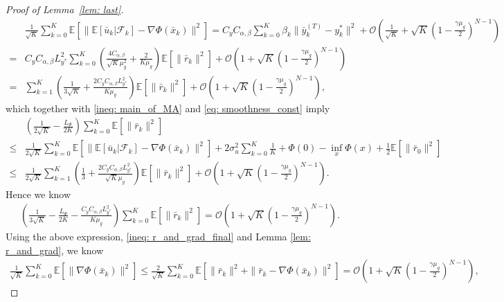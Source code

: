\documentclass{article}
\theoremstyle{plain}
\theoremstyle{definition}
\theoremstyle{remark}
\newcommand{\E}{\mathbb{E}}
\newcommand{\F}{\mathcal{F}}
\newcommand{\cO}{\mathcal{O}}
\begin{document}
\begin{proof}[Proof of Lemma~\ref{lem: last}]
\begin{equation}
\begin{aligned}
            &\frac{1}{\sqrt{K}}\sum_{k=0}^{K}\E\left[\|\E\left[\bar{u}_k|\F_k\right] - \nabla\Phi(\bar{x}_k)\|^2\right]=C_yC_{\alpha,\beta}\sum_{k=0}^{K}\beta_k\|\bar{y}_k^{(T)} - y_k^*\|^2 + \cO\left(\frac{1}{\sqrt{K}} + \sqrt{K}\left(1-\frac{\gamma\mu_g}{2}\right)^{N-1}\right)\\
            = &C_yC_{\alpha,\beta}L_{y^*}^2\sum_{k=0}^{K}\left(\frac{4C_{\alpha,\beta}}{\sqrt{K}\mu_g^2}+\frac{2}{K\mu_g}\right)\E\left[\|\bar{r}_k\|^2\right] + \cO\left(1 + \sqrt{K}\left(1-\frac{\gamma\mu_g}{2}\right)^{N-1}\right)\\ 
            =&\sum_{k=1}^{K}\left(\frac{1}{3\sqrt{K}}+\frac{2C_yC_{\alpha,\beta}L_{y^*}^2}{K\mu_g}\right)\E\left[\|\bar{r}_k\|^2\right] + \cO\left(1 + \sqrt{K}\left(1-\frac{\gamma\mu_g}{2}\right)^{N-1}\right),
        \end{aligned}
    \end{equation}
    which together with \eqref{ineq: main_of_MA} and \eqref{eq: smoothness_const} imply 
    \begin{align*}
        &\left(\frac{1}{2\sqrt{K}} - \frac{L_{\Phi}}{2K}\right)\sum_{k=0}^{K}\E\left[\|\bar{r}_k\|^2\right] \\
        \leq &\frac{1}{2\sqrt{K}}\sum_{k=0}^{K}\E\left[\|\E\left[\bar{u}_k|\F_k\right] - \nabla\Phi(\bar{x}_k)\|^2\right] + 2\sigma_u^2\sum_{k=0}^{K}\frac{1}{K} + \Phi(0) - \inf_x\Phi(x) + \frac{1}{2}\E\left[\|\bar{r}_0\|^2\right] \\
        \leq &\frac{1}{2\sqrt{K}}\sum_{k=1}^{K}\left(\frac{1}{3}+\frac{2C_yC_{\alpha,\beta}L_{y^*}^2}{\sqrt{K}\mu_g}\right)\E\left[\|\bar{r}_k\|^2\right] + \cO\left(1 + \sqrt{K}\left(1-\frac{\gamma\mu_g}{2}\right)^{N-1}\right).
    \end{align*}
    Hence we know
    \begin{align*}
        \left(\frac{1}{3\sqrt{K}} - \frac{L_{\Phi}}{2K} - \frac{C_yC_{\alpha,\beta}L_{y^*}^2}{K\mu_g}\right)\sum_{k=0}^{K}\E\left[\|\bar{r}_k\|^2\right] = \cO\left(1 + \sqrt{K}\left(1-\frac{\gamma\mu_g}{2}\right)^{N-1}\right).
    \end{align*}
    Using the above expression, \eqref{ineq: r_and_grad_final} and Lemma \ref{lem: r_and_grad}, we know 
    \begin{align*}
        \frac{1}{\sqrt{K}}\sum_{k=0}^{K}\E\left[\|\nabla\Phi(\bar{x}_k)\|^2\right]\leq \frac{2}{\sqrt{K}}\sum_{k=0}^{K}\E\left[\|\bar{r}_k\|^2 + \|\bar{r}_k - \nabla\Phi(\bar{x}_k)\|^2\right] = \cO\left(1 + \sqrt{K}\left(1-\frac{\gamma\mu_g}{2}\right)^{N-1}\right),
    \end{align*}

\end{proof}
\end{document}
